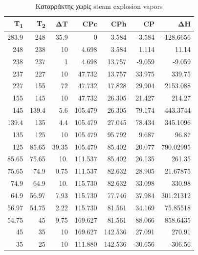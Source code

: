 \documentclass[11pt]{article}
\begin{document}
\begin{table}[htbp]
\caption{Καταρράκτης χωρίς steam explosion vapors}
\centering
\begin{tabular}{rrrrrrr}
Τ\textsubscript{1} & T\textsubscript{2} & ΔΤ & CPc & CPh & CP & ΔΗ\\
\hline
283.9 & 248 & 35.9 & 0 & 3.584 & -3.584 & -128.6656\\
248 & 238 & 10 & 4.698 & 3.584 & 1.114 & 11.14\\
238 & 237 & 1 & 4.698 & 13.757 & -9.059 & -9.059\\
237 & 227 & 10 & 47.732 & 13.757 & 33.975 & 339.75\\
227 & 155 & 72 & 47.732 & 17.828 & 29.904 & 2153.088\\
155 & 145 & 10 & 47.732 & 26.305 & 21.427 & 214.27\\
145 & 139.4 & 5.6 & 105.479 & 26.305 & 79.174 & 443.3744\\
139.4 & 135 & 4.4 & 105.479 & 27.045 & 78.434 & 345.1096\\
135 & 125 & 10 & 105.479 & 95.792 & 9.687 & 96.87\\
125 & 85.65 & 39.35 & 105.479 & 85.402 & 20.077 & 790.02995\\
85.65 & 75.65 & 10. & 111.537 & 85.402 & 26.135 & 261.35\\
75.65 & 74.9 & 0.75 & 111.537 & 82.632 & 28.905 & 21.67875\\
74.9 & 64.9 & 10. & 115.730 & 82.632 & 33.098 & 330.98\\
64.9 & 56.97 & 7.93 & 115.730 & 77.746 & 37.984 & 301.21312\\
56.97 & 54.75 & 2.22 & 115.730 & 81.561 & 34.169 & 75.85518\\
54.75 & 45 & 9.75 & 169.627 & 81.561 & 88.066 & 858.6435\\
45 & 35 & 10 & 169.627 & 142.536 & 27.091 & 270.91\\
35 & 25 & 10 & 111.880 & 142.536 & -30.656 & -306.56\\
\end{tabular}
\end{table}
\end{document}
